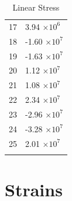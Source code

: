 \documentclass[a4paper,11pt]{article}
\begin{document}
\begin{center}
\begin{longtable}{|R{1.5cm}|R{2.5cm}|}
   17 &         3.94 $\times 10^{           6}$ \\
   18 &        -1.60 $\times 10^{           7}$ \\
   19 &        -1.63 $\times 10^{           7}$ \\
   20 &         1.12 $\times 10^{           7}$ \\
   21 &         1.08 $\times 10^{           7}$ \\
 {\color{OliveGreen}  22} & {\color{OliveGreen}        2.34 $\times 10^{           7}$} \\
   23 &        -2.96 $\times 10^{           7}$ \\
 {\color{red}  24} & {\color{red}       -3.28 $\times 10^{           7}$}\\
   25 &         2.01 $\times 10^{           7}$ \\
\bottomrule[0.8mm]                               
\caption{Linear Stress}             
\end{longtable}                                  
\end{center}                                     

\newpage       

\section{Strains}
\end{document}

